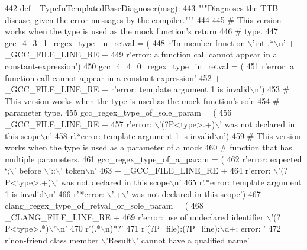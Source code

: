 \begin{DoxyCode}
442 \textcolor{keyword}{def }\hyperlink{namespacegmock__doctor_ac4e4908d4e43ef87f522365e99ec36c8}{\_TypeInTemplatedBaseDiagnoser}(msg):
443   \textcolor{stringliteral}{"""Diagnoses the TTB disease, given the error messages by the compiler."""}
444 
445   \textcolor{comment}{# This version works when the type is used as the mock function's return}
446   \textcolor{comment}{# type.}
447   gcc\_4\_3\_1\_regex\_type\_in\_retval = (
448       \textcolor{stringliteral}{r'In member function \(\backslash\)'int .*\(\backslash\)n'} + \_GCC\_FILE\_LINE\_RE +
449       \textcolor{stringliteral}{r'error: a function call cannot appear in a constant-expression'})
450   gcc\_4\_4\_0\_regex\_type\_in\_retval = (
451       \textcolor{stringliteral}{r'error: a function call cannot appear in a constant-expression'}
452       + \_GCC\_FILE\_LINE\_RE + \textcolor{stringliteral}{r'error: template argument 1 is invalid\(\backslash\)n'})
453   \textcolor{comment}{# This version works when the type is used as the mock function's sole}
454   \textcolor{comment}{# parameter type.}
455   gcc\_regex\_type\_of\_sole\_param = (
456       \_GCC\_FILE\_LINE\_RE +
457       \textcolor{stringliteral}{r'error: \(\backslash\)'(?P<type>.+)\(\backslash\)' was not declared in this scope\(\backslash\)n'}
458       \textcolor{stringliteral}{r'.*error: template argument 1 is invalid\(\backslash\)n'})
459   \textcolor{comment}{# This version works when the type is used as a parameter of a mock}
460   \textcolor{comment}{# function that has multiple parameters.}
461   gcc\_regex\_type\_of\_a\_param = (
462       \textcolor{stringliteral}{r'error: expected `;\(\backslash\)' before \(\backslash\)'::\(\backslash\)' token\(\backslash\)n'}
463       + \_GCC\_FILE\_LINE\_RE +
464       \textcolor{stringliteral}{r'error: \(\backslash\)'(?P<type>.+)\(\backslash\)' was not declared in this scope\(\backslash\)n'}
465       \textcolor{stringliteral}{r'.*error: template argument 1 is invalid\(\backslash\)n'}
466       \textcolor{stringliteral}{r'.*error: \(\backslash\)'.+\(\backslash\)' was not declared in this scope'})
467   clang\_regex\_type\_of\_retval\_or\_sole\_param = (
468       \_CLANG\_FILE\_LINE\_RE +
469       \textcolor{stringliteral}{r'error: use of undeclared identifier \(\backslash\)'(?P<type>.*)\(\backslash\)'\(\backslash\)n'}
470       \textcolor{stringliteral}{r'(.*\(\backslash\)n)*?'}
471       \textcolor{stringliteral}{r'(?P=file):(?P=line):\(\backslash\)d+: error: '}
472       \textcolor{stringliteral}{r'non-friend class member \(\backslash\)'Result\(\backslash\)' cannot have a qualified name'}

\end{DoxyCode}
